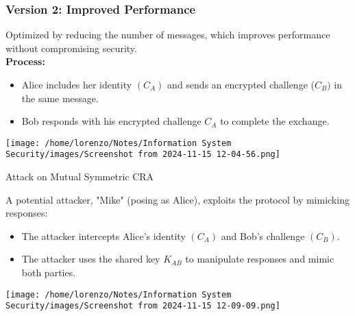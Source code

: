 \subsubsection{Version 2: Improved Performance}
\begin{minipage}{0.5\textwidth}
    Optimized by reducing the number of messages, which improves performance without compromising security.
    \\ \textbf{Process:}
    \begin{itemize}
        \item Alice includes her identity \((C_A)\) and sends an encrypted challenge (\(C_B)\) in the same message.
        \item Bob responds with his encrypted challenge \(C_A\) to complete the exchange.
    \end{itemize} 

\end{minipage} 
\hspace{0cm}
\begin{minipage}{0.5\textwidth}
    \centering
    \texttt{[image: /home/lorenzo/Notes/Information System Security/images/Screenshot from 2024-11-15 12-04-56.png]}
\end{minipage}

\begin{quotebox}[colframe=blue!10!white, colback=blue!5!white]{Attack on Mutual Symmetric CRA}
    \begin{minipage}{0.5\textwidth}
        \vspace{-0.5cm}
        A potential attacker, "Mike" (posing as Alice), exploits the protocol by mimicking responses:
        \begin{itemize}
            \item The attacker intercepts Alice's identity \((C_A)\) and Bob's challenge \((C_B)\).
            \item The attacker uses the shared key \(K_{AB}\) to manipulate responses and mimic both parties.
        \end{itemize}
    \end{minipage} 
    \hspace{1cm}
    \begin{minipage}{0.3\textwidth}
        \centering
        \texttt{[image: /home/lorenzo/Notes/Information System Security/images/Screenshot from 2024-11-15 12-09-09.png]}
    \end{minipage}
\end{quotebox}

